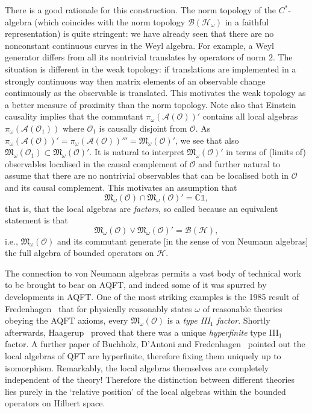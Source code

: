 \documentclass[12pt]{article}
\newcommand{\1}{\mathds{1}}                         %
\newcommand{\CC}{\mathbb{C}}           %
\newcommand{\Ocal}{\mathcal{O}}
\newcommand{\BB}{{\mathcal{B}}}
\newcommand{\HH}{{\mathcal{H}}}
\newcommand{\Mf}{{\mathfrak{M}}}
\newcommand{\II}{{\mathbb{1}}}
\newcommand{\Ac}{{\mathcal{A}}}
\begin{document}
There is a good rationale for this construction. The norm topology of the $C^*$-algebra (which coincides with the norm topology $\BB(\HH_\omega)$ in a faithful representation) is quite stringent: we have already seen that there are no nonconstant continuous curves in the Weyl algebra. For example, a Weyl generator differs from all its nontrivial translates by operators of norm $2$. The situation is different in the weak topology: if translations are implemented in a strongly continuous way then matrix elements of an observable change continuously as the observable is translated. This motivates the weak topology as a better measure of proximity than the norm topology. Note also that Einstein causality implies that the commutant $\pi_\omega(\Ac(\Ocal))'$ contains all local algebras $\pi_\omega(\Ac(\Ocal_1))$ 
where $\Ocal_1$ is causally disjoint from $\Ocal$. As $\pi_\omega(\Ac(\Ocal))'=\pi_\omega(\Ac(\Ocal))'''=\Mf_\omega(\Ocal)'$, we see that also $\Mf_\omega(\Ocal_1) \subset \Mf_\omega(\Ocal)'$. It is natural to interpret $\Mf_\omega(\Ocal)'$ in terms of (limits of) observables localised in the causal complement of $\Ocal$ and further natural to assume that
there are no nontrivial observables that can be localised both in $\Ocal$ and its causal complement. This motivates an assumption that
\[
\Mf_\omega(\Ocal)\cap \Mf_\omega(\Ocal)' = \CC\II,
\]
that is, that the local algebras are \emph{factors}, so called because an equivalent statement is that
\[
\Mf_\omega(\Ocal)\vee \Mf_\omega(\Ocal)' = \BB(\HH),
\]
i.e., $\Mf_\omega(\Ocal)$ and its commutant generate [in the sense of von Neumann algebras] the full algebra of bounded operators on $\HH$.


The connection to von Neumann algebras permits a vast body of technical work to be brought to bear on AQFT, and indeed some of it was spurred by developments in AQFT. One of the most striking examples is the 1985 result of Fredenhagen~\cite{Fredenhagen:1985} that for physically reasonably states $\omega$ of reasonable theories obeying the AQFT axioms, every $\Mf_\omega(\Ocal)$ is a \emph{type  III${}_1$ factor}. Shortly afterwards, Haagerup~\cite{Haagerup:1987} proved that there was a unique \emph{hyperfinite} type III${}_1$ factor. A further paper of Buchholz, D'Antoni and Fredenhagen~\cite{BucDAnFre:1987} pointed out the local algebras of QFT are hyperfinite, therefore fixing them uniquely up to isomorphism. Remarkably, the local algebras themselves are completely independent of the theory! Therefore the distinction between different theories lies purely in the `relative position' of the local algebras within the bounded operators on Hilbert space.
\end{document}
